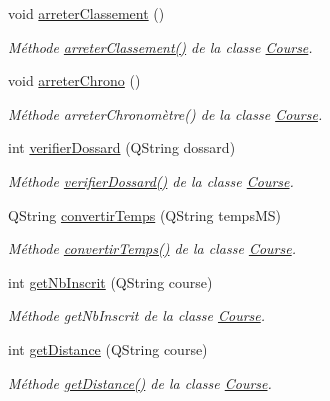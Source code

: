 \begin{DoxyCompactItemize}
void \hyperlink{class_course_a4426310a411d8ecf7f4a2dc64c24a42d}{arreter\+Classement} ()
\begin{DoxyCompactList}\small\item\em Méthode \hyperlink{class_course_a4426310a411d8ecf7f4a2dc64c24a42d}{arreter\+Classement()} de la classe \hyperlink{class_course}{Course}. \end{DoxyCompactList}\item 
void \hyperlink{class_course_a939635ac8301a7018475cc2ce347375f}{arreter\+Chrono} ()
\begin{DoxyCompactList}\small\item\em Méthode arreter\+Chronomètre() de la classe \hyperlink{class_course}{Course}. \end{DoxyCompactList}\item 
int \hyperlink{class_course_a6cb3ede6a11e4813f95be92f4459a3c2}{verifier\+Dossard} (Q\+String dossard)
\begin{DoxyCompactList}\small\item\em Méthode \hyperlink{class_course_a6cb3ede6a11e4813f95be92f4459a3c2}{verifier\+Dossard()} de la classe \hyperlink{class_course}{Course}. \end{DoxyCompactList}\item 
Q\+String \hyperlink{class_course_ab98bbd1a92e468df7b8b45bb7877afef}{convertir\+Temps} (Q\+String temps\+MS)
\begin{DoxyCompactList}\small\item\em Méthode \hyperlink{class_course_ab98bbd1a92e468df7b8b45bb7877afef}{convertir\+Temps()} de la classe \hyperlink{class_course}{Course}. \end{DoxyCompactList}\item 
int \hyperlink{class_course_ad0ff4153f1e02826d551f478f95ad260}{get\+Nb\+Inscrit} (Q\+String course)
\begin{DoxyCompactList}\small\item\em Méthode get\+Nb\+Inscrit de la classe \hyperlink{class_course}{Course}. \end{DoxyCompactList}\item 
int \hyperlink{class_course_af20fcd6d6eb2dfbd3b0f12e273f12b27}{get\+Distance} (Q\+String course)
\begin{DoxyCompactList}\small\item\em Méthode \hyperlink{class_course_af20fcd6d6eb2dfbd3b0f12e273f12b27}{get\+Distance()} de la classe \hyperlink{class_course}{Course}. \end{DoxyCompactList}\item 

\end{DoxyCompactItemize}
